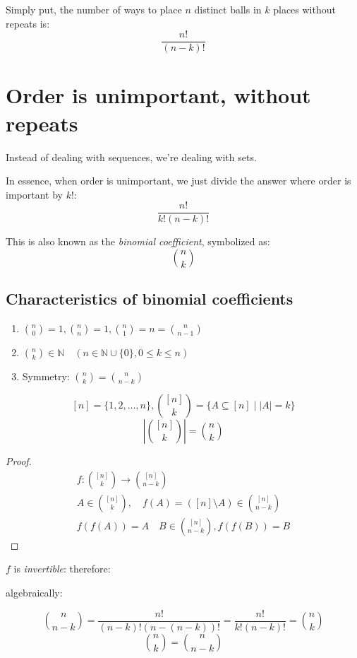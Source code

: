 \documentclass[00_complete]{subfiles}
\begin{document}
Simply put, the number of ways to place $n$ distinct balls in $k$ places
without repeats is:
$$\frac{n!}{(n-k)!}$$
\section{Order is unimportant, without repeats}

Instead of dealing with sequences, we're dealing with sets.

In essence, when order is unimportant, we just divide the answer where order is
important by $k!$:
$$
    \frac{n!}{k!(n-k)!}
$$

This is also known as the \emph{binomial coefficient}, symbolized as:
$$
    \binom{n}{k}
$$

\subsection{Characteristics of binomial coefficients}
\begin{enumerate}
    \item $\displaystyle \binom{n}{0} = 1, \binom{n}{n} = 1, \binom{n}{1} = n = \binom{n}{n-1}$
    \item $\displaystyle \binom{n}{k} \in \mathbb{N} \quad (n \in \mathbb{N}\cup\{0\}, 0 \leq k \leq
   n)$
    \item Symmetry: $\displaystyle \binom{n}{k} = \binom{n}{n-k}$
\end{enumerate}

\begin{symbols}
$$[n] = \{1,2, \dots, n\},
\binom{[n]}{k} = \{A \subseteq [n] \mid |A| = k \}$$
$$\left|\binom{[n]}{k}\right| = \binom{n}{k}$$
\end{symbols}

\begin{proof}
$$
\begin{gathered}
    f : \binom{[n]}{k} \to \binom{[n]}{n-k} \\
    A \in \binom{[n]}{k}, \quad f(A)=([n]\setminus A) \in \binom{[n]}{n-k} \\
    f(f(A)) = A \quad B \in \binom{[n]}{n-k}, f(f(B))=B
\end{gathered}
$$
\end{proof}

\begin{conclusion}
$f$ is \emph{invertible}: therefore:
\end{conclusion}
algebraically:

$$\binom{n}{n-k} = \frac{n!}{(n-k)!(n-(n-k))!} = \frac{n!}{k!(n-k)!} =
\binom{n}{k}$$
$$\binom{n}{k}=\binom{n}{n-k}$$
\end{document}
